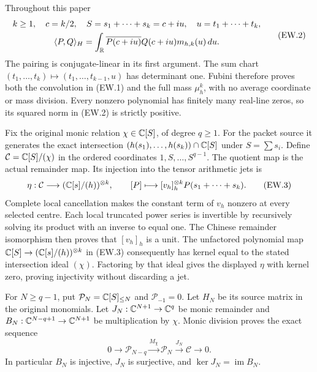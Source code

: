 Throughout this paper
\[
 \begin{gathered}
 k\ge1,\quad c=k/2,\quad S=s_1+\cdots+s_k=c+iu,
 \quad u=t_1+\cdots+t_k,\\
 \langle P,Q\rangle_H=
 \int_\mathbb R\overline{P(c+iu)}Q(c+iu)m_{h,k}(u)\,du.
 \end{gathered}                                               \tag{EW.2}
\]
The pairing is conjugate-linear in its first argument. The sum chart
$(t_1,\ldots,t_k)\mapsto(t_1,\ldots,t_{k-1},u)$ has determinant
one. Fubini therefore proves both the convolution in (EW.1) and the
full mass $\mu_h^k$, with no average coordinate or mass division.
Every nonzero polynomial has finitely many real-line zeros, so its
squared norm in (EW.2) is strictly positive.

Fix the original monic relation $\chi\in\mathbb C[S]$, of degree $q\ge1$.
For the packet source it generates the exact intersection
$(h(s_1),\ldots,h(s_k))\cap\mathbb C[S]$ under $S=\sum s_i$.
Define $\mathcal C=\mathbb C[S]/(\chi)$ in the ordered coordinates
$1,S,\ldots,S^{q-1}$. The quotient map is the actual remainder
map. Its injection into the tensor arithmetic jets is
\[
 \eta:\mathcal C\longrightarrow(\mathbb C[s]/(h))^{\otimes k},
 \qquad [P]\longmapsto[v_h]_h^{\otimes k}P(s_1+\cdots+s_k).
                                                               \tag{EW.3}
\]
Complete local cancellation makes the constant term of $v_h$ nonzero
at every selected centre. Each local truncated power series is
invertible by recursively solving its product with an inverse to
equal one. The Chinese remainder isomorphism then proves that
$[v_h]_h$ is a unit. The unfactored polynomial map
$\mathbb C[S]\to(\mathbb C[s]/(h))^{\otimes k}$ in (EW.3) consequently has
kernel equal to the stated intersection ideal $(\chi)$. Factoring
by that ideal gives the displayed $\eta$ with kernel zero,
proving injectivity without discarding a jet.

For $N\ge q-1$, put $\mathcal P_N=\mathbb C[S]_{\le N}$ and
$\mathcal P_{-1}=0$. Let $H_N$ be its source matrix in the original
monomials. Let $J_N:\mathbb C^{N+1}\to\mathbb C^q$ be monic remainder
and $B_N:\mathbb C^{N-q+1}\to\mathbb C^{N+1}$ be multiplication by $\chi$.
Monic division proves the exact sequence
\[
 0\longrightarrow\mathcal P_{N-q}
 \xrightarrow{M_\chi}\mathcal P_N
 \xrightarrow{J_N}\mathcal C\longrightarrow0.                \tag{EW.4}
\]
In particular $B_N$ is injective, $J_N$ is surjective, and
$\ker J_N=\operatorname{im}B_N$.

